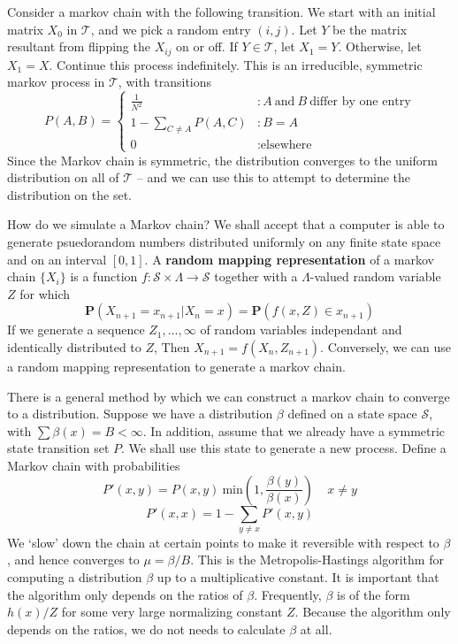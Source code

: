 Consider a markov chain with the following transition. We start with an initial matrix $X_0$ in $\mathcal{T}$, and we pick a random entry $(i,j)$. Let $Y$ be the matrix resultant from flipping the $X_{ij}$ on or off. If $Y \in \mathcal{T}$, let $X_1 = Y$. Otherwise, let $X_1 = X$. Continue this process indefinitely. This is an irreducible, symmetric markov process in $\mathcal{T}$, with transitions
%
\[
    P(A,B) =
    \begin{cases}
        \frac{1}{N^2} & : A\ \text{and}\ B\ \text{differ by one entry}\\
        1 - \sum_{C \neq A} P(A,C) & : B = A\\
        0 & : \text{elsewhere}
    \end{cases}
\]
%
Since the Markov chain is symmetric, the distribution converges to the uniform distribution on all of $\mathcal{T}$ -- and we can use this to attempt to determine the distribution on the set.

How do we simulate a Markov chain? We shall accept that a computer is able to generate psuedorandom numbers distributed uniformly on any finite state space and on an interval $[0,1]$. A {\bf random mapping representation} of a markov chain $\{ X_i \}$ is a function $f:\mathcal{S} \times \Lambda \to \mathcal{S}$ together with a $\Lambda$-valued random variable $Z$ for which
%
\[ \mathbf{P}(X_{n+1} = x_{n+1} | X_n = x) = \mathbf{P}(f(x,Z) \in x_{n+1}) \]
%
If we generate a sequence $Z_1, \dots, \infty$ of random variables independant and identically distributed to $Z$, Then $X_{n+1} = f(X_n,Z_{n+1})$. Conversely, we can use a random mapping representation to generate a markov chain.

There is a general method by which we can construct a markov chain to converge to a distribution. Suppose we have a distribution $\beta$ defined on a state space $\mathcal{S}$, with $\sum \beta(x) = B < \infty$. In addition, assume that we already have a symmetric state transition set $P$. We shall use this state to generate a new process. Define a Markov chain with probabilities
%
\[ P'(x,y) = P(x,y)\ \text{min}(1, \frac{\beta(y)}{\beta(x)})\ \ \ \ \ x \neq y \]
%
\[ P'(x,x) = 1 - \sum_{y \neq x} P'(x,y) \]
%
We `slow' down the chain at certain points to make it reversible with respect to $\beta$, and hence converges to $\mu = \beta/B$. This is the Metropolis-Hastings algorithm for computing a distribution $\beta$ up to a multiplicative constant. It is important that the algorithm only depends on the ratios of $\beta$. Frequently, $\beta$ is of the form $h(x)/Z$ for some very large normalizing constant $Z$. Because the algorithm only depends on the ratios, we do not needs to calculate $\beta$ at all.





